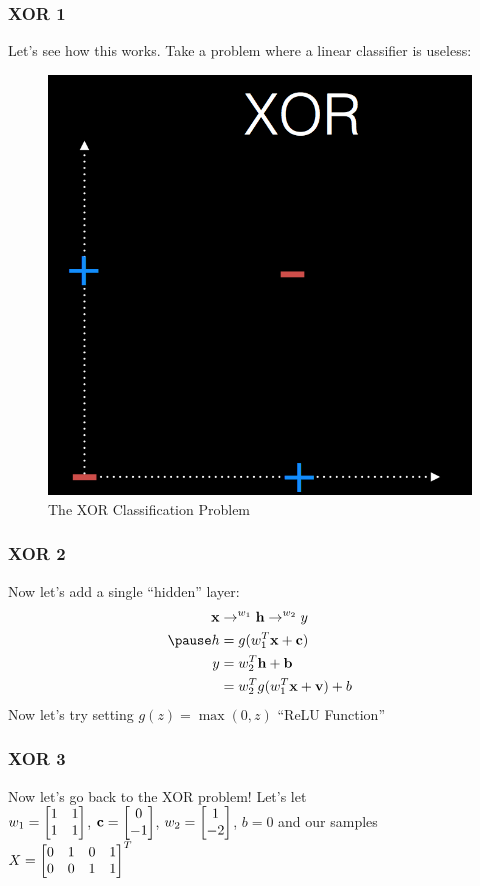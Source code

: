 \documentclass[10pt]{beamer}
\begin{document}
\begin{frame}
	\frametitle{XOR 1}
	Let's see how this works.
	Take a problem where a linear classifier is useless:
	\begin{figure}
		\includegraphics[width=\textwidth,height=0.5\textheight,keepaspectratio=true]{xor.png}
		\caption{The XOR Classification Problem}
	\end{figure}
\end{frame}

\begin{frame}
	\frametitle{XOR 2}
	Now let's add a single ``hidden'' layer:
	\begin{align}
		\vb{x} &\rightarrow^{w_1} \vb{h} \rightarrow^{w_2} y \\
		\pause
		h &= g(w_1^T \vb{x} + \vb{c}) \\
		y &= w_2^T \vb{h} + \vb{b} \\
		&= w_2^T g(w_1^T \vb{x} + \vb{v}) + b
	\end{align}
	\pause
	Now let's try setting $g(z) = \max(0, z)$ ``ReLU Function''
\end{frame}

\begin{frame}
	\frametitle{XOR 3}
	Now let's go back to the XOR problem!
	Let's let\\
		$w_1 = \qty[\begin{matrix}1&1\\1&1\end{matrix}]$, $\vb{c} = \qty[\begin{matrix}0\\-1\end{matrix}]$, $w_2 = \qty[\begin{matrix}1\\-2\end{matrix}]$, $b=0$
	and our samples\\
		$X=\qty[\begin{matrix}0&1&0&1\\0&0&1&1\end{matrix}]^T$
\end{frame}
\end{document}
